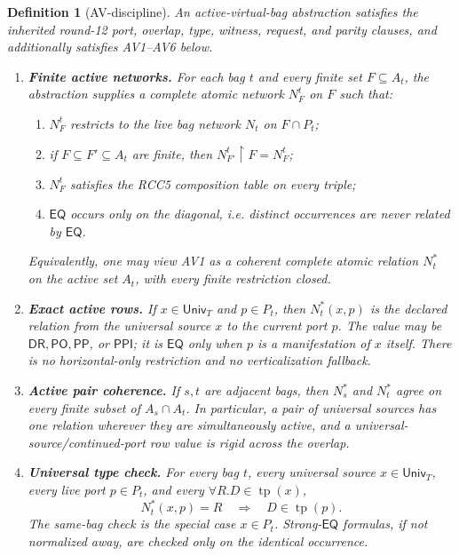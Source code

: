 \documentclass[11pt]{article}
\newtheorem{definition}[theorem]{Definition}
\newcommand{\EQ}{\mathsf{EQ}}
\newcommand{\PP}{\mathsf{PP}}
\newcommand{\PPI}{\mathsf{PPI}}
\newcommand{\PO}{\mathsf{PO}}
\newcommand{\DR}{\mathsf{DR}}
\newcommand{\tp}{\operatorname{tp}}
\newcommand{\Univ}{\mathsf{Univ}}
\begin{document}
\begin{definition}[AV-discipline]\label{def:AV}
An active-virtual-bag abstraction satisfies the inherited round-12 port,
overlap, type, witness, request, and parity clauses, and additionally satisfies
AV1--AV6 below.

\begin{enumerate}[label=(AV\arabic*),leftmargin=3.1em]
\item \textbf{Finite active networks.}  For each bag \(t\) and every finite
set \(F\subseteq A_t\), the abstraction supplies a complete atomic network
\(N^t_F\) on \(F\) such that:
\begin{enumerate}[label=(\alph*),leftmargin=2em]
\item \(N^t_F\) restricts to the live bag network \(N_t\) on
      \(F\cap P_t\);
\item if \(F\subseteq F'\subseteq A_t\) are finite, then
      \(N^t_{F'}\restriction F=N^t_F\);
\item \(N^t_F\) satisfies the RCC5 composition table on every triple;
\item \(\EQ\) occurs only on the diagonal, i.e. distinct occurrences are never
      related by \(\EQ\).
\end{enumerate}
Equivalently, one may view AV1 as a coherent complete atomic relation
\(N^*_t\) on the active set \(A_t\), with every finite restriction closed.

\item \textbf{Exact active rows.}  If \(x\in\Univ_T\) and \(p\in P_t\), then
\(N^*_t(x,p)\) is the declared relation from the universal source \(x\) to the
current port \(p\).  The value may be \(\DR,\PO,\PP\), or \(\PPI\); it is
\(\EQ\) only when \(p\) is a manifestation of \(x\) itself.  There is no
horizontal-only restriction and no verticalization fallback.

\item \textbf{Active pair coherence.}  If \(s,t\) are adjacent bags, then
\(N^*_s\) and \(N^*_t\) agree on every finite subset of
\(A_s\cap A_t\).  In particular, a pair of universal sources has one relation
wherever they are simultaneously active, and a universal-source/continued-port
row value is rigid across the overlap.

\item \textbf{Universal type check.}  For every bag \(t\), every universal
source \(x\in\Univ_T\), every live port \(p\in P_t\), and every
\(\forall R.D\in\tp(x)\),
\[
  N^*_t(x,p)=R \quad\Longrightarrow\quad D\in\tp(p).
\]
The same-bag check is the special case \(x\in P_t\).  Strong-\(\EQ\) formulas,
if not normalized away, are checked only on the identical occurrence.


\end{enumerate}
\end{definition}
\end{document}
